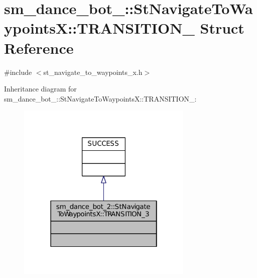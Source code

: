 \hypertarget{structsm__dance__bot__2_1_1StNavigateToWaypointsX_1_1TRANSITION__3}{}\section{sm\+\_\+dance\+\_\+bot\+\_\+:\+:St\+Navigate\+To\+WaypointsX\+:\+:T\+R\+A\+N\+S\+I\+T\+I\+O\+N\+\_ Struct Reference}
\label{structsm__dance__bot__2_1_1StNavigateToWaypointsX_1_1TRANSITION__3}


{\ttfamily \#include $<$st\+\_\+navigate\+\_\+to\+\_\+waypoints\+\_\+x.\+h$>$}



Inheritance diagram for sm\+\_\+dance\+\_\+bot\+\_\+:\+:St\+Navigate\+To\+WaypointsX\+:\+:T\+R\+A\+N\+S\+I\+T\+I\+O\+N\+\_\+:
\nopagebreak
\begin{figure}[H]
\begin{center}
\leavevmode
\includegraphics[width=238pt]{structsm__dance__bot__2_1_1StNavigateToWaypointsX_1_1TRANSITION__3__inherit__graph}
\end{center}
\end{figure}


